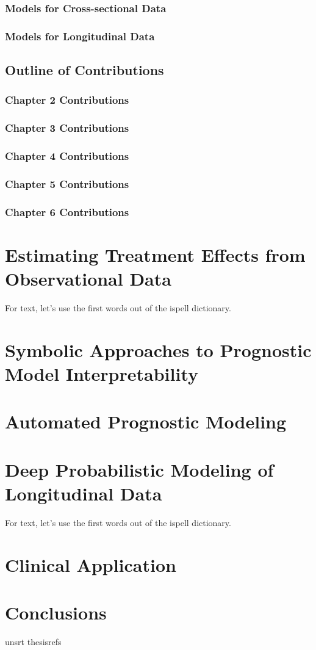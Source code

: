 \documentclass [PhD] {uclathes}
\begin{document}
\subsection{Models for Cross-sectional Data}
\subsection{Models for Longitudinal Data}

\section{Outline of Contributions}
\subsection*{Chapter 2 Contributions}
\subsection*{Chapter 3 Contributions}
\subsection*{Chapter 4 Contributions}
\subsection*{Chapter 5 Contributions}
\subsection*{Chapter 6 Contributions}


\chapter{Estimating Treatment Effects from Observational Data}

For text, let's use the first words out of the ispell dictionary.

\chapter{Symbolic Approaches to Prognostic Model Interpretability}

\chapter{Automated Prognostic Modeling}

\chapter{Deep Probabilistic Modeling of Longitudinal Data}

For text, let's use the first words out of the ispell dictionary.

\chapter{Clinical Application}

\chapter{Conclusions}

\nocite{*}
 {unsrt} %
 {thesisrefs}    %
\end{document}
